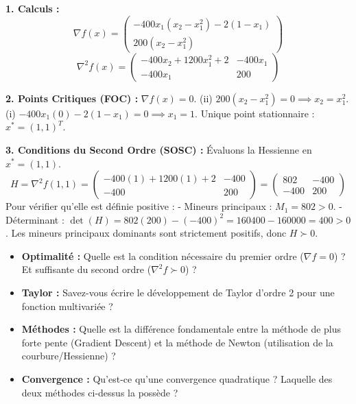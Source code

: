 \begin{correction}
\textbf{1. Calculs :}
$$ \nabla f(x) = \begin{pmatrix} -400x_1(x_2 - x_1^2) - 2(1-x_1) \\ 200(x_2 - x_1^2) \end{pmatrix} $$
$$ \nabla^2 f(x) = \begin{pmatrix} -400x_2 + 1200x_1^2 + 2 & -400x_1 \\ -400x_1 & 200 \end{pmatrix} $$

\textbf{2. Points Critiques (FOC) :}
$\nabla f(x) = 0$.
(ii) $200(x_2 - x_1^2) = 0 \implies x_2 = x_1^2$.
(i) $-400x_1(0) - 2(1-x_1) = 0 \implies x_1 = 1$.
Unique point stationnaire : $x^* = (1, 1)^T$.

\textbf{3. Conditions du Second Ordre (SOSC) :}
Évaluons la Hessienne en $x^*=(1,1)$.
$$ H = \nabla^2 f(1,1) = \begin{pmatrix} -400(1) + 1200(1) + 2 & -400 \\ -400 & 200 \end{pmatrix} = \begin{pmatrix} 802 & -400 \\ -400 & 200 \end{pmatrix} $$
Pour vérifier qu'elle est définie positive :
- Mineurs principaux : $M_1 = 802 > 0$.
- Déterminant : $\det(H) = 802(200) - (-400)^2 = 160400 - 160000 = 400 > 0$.
Les mineurs principaux dominants sont strictement positifs, donc $H \succ 0$.
\end{correction}
\bigskip
\bigskip
\begin{checkpoint}
\begin{itemize}
    \item \textbf{Optimalité :} Quelle est la condition nécessaire du premier ordre ($\nabla f = 0$) ? Et suffisante du second ordre ($\nabla^2 f \succ 0$) ?
    \item \textbf{Taylor :} Savez-vous écrire le développement de Taylor d'ordre 2 pour une fonction multivariée ?
    \item \textbf{Méthodes :} Quelle est la différence fondamentale entre la méthode de plus forte pente (Gradient Descent) et la méthode de Newton (utilisation de la courbure/Hessienne) ?
    \item \textbf{Convergence :} Qu'est-ce qu'une convergence quadratique ? Laquelle des deux méthodes ci-dessus la possède ?
\end{itemize}
\end{checkpoint}


